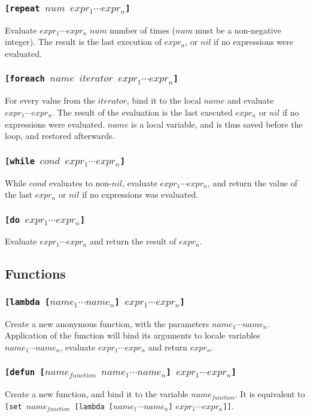 \subsubsection{\tt{[repeat }$num$ $expr_1 \cdots expr_n$\tt{]}}
Evaluate $expr_1 \cdots expr_n$ $num$ number of times ($num$ must be a non-negative integer). The result is the last execution of $expr_n$, or $nil$ if no expressions were evaluated.

\subsubsection{\tt{[foreach }$name$ $iterator$ $expr_1 \cdots expr_n$\tt{]}}
For every value from the $iterator$, bind it to the local $name$ and evaluate $expr_1 \cdots expr_n$. The result of the evaluation is the last executed $expr_n$ or $nil$ if no expressions were evaluated. $name$ is a local variable, and is thus saved before the loop, and restored afterwards.

\subsubsection{\tt{[while }$cond$ $expr_1 \cdots expr_n$\tt{]}}
While $cond$ evaluates to non-$nil$, evaluate $expr_1 \cdots expr_n$, and return the value of the last $expr_n$ or $nil$ if no expressions was evaluated.


\subsubsection{\tt{[do }$expr_1 \cdots expr_n$\tt{]}}
Evaluate $expr_1 \cdots expr_n$ and return the result of $expr_n$.


\subsection{Functions}
\subsubsection{\tt{[lambda [}$name_1 \cdots name_n$\tt{]} $expr_1 \cdots expr_n$\tt{]}}
Create a new anonymous function, with the parameters $name_1\cdots name_n$. Application of the function will bind its arguments to locale variables $name_1\cdots name_n$, evaluate $expr_1\cdots expr_n$ and return $expr_n$.
\subsubsection{\tt{[defun [}$name_{function}$ $name_1 \cdots name_n$\tt{]} $expr_1 \cdots expr_n$\tt{]}}
Create a new function, and bind it to the variable $name_{function}$. It is equivalent to {\tt{[set }}$name_{function}${\tt{ [lambda [}}$name_1 \cdots name_n${\tt{]}} $expr_1 \cdots expr_n${\tt{]]}}.

